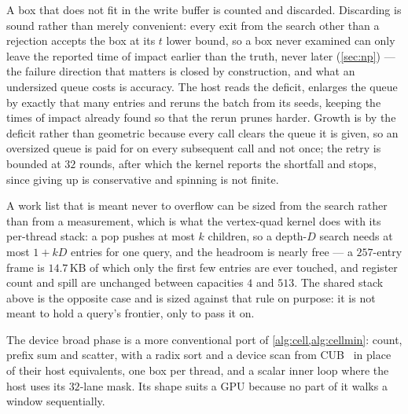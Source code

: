 A box that does not fit in the write buffer is counted and discarded. Discarding
is sound rather than merely convenient: every exit from the search other than a
rejection accepts the box at its $t$ lower bound, so a box never examined can
only leave the reported time of impact earlier than the truth, never later
(\cref{sec:np}) --- the failure direction that matters is closed by
construction, and what an undersized queue costs is accuracy. The host reads the
deficit, enlarges the queue by exactly that many entries and reruns the batch
from its seeds, keeping the times of impact already found so that the rerun
prunes harder. Growth is by the deficit rather than geometric because every call
clears the queue it is given, so an oversized queue is paid for on every
subsequent call and not once; the retry is bounded at $32$ rounds, after which
the kernel reports the shortfall and stops, since giving up is conservative and
spinning is not finite.

A work list that is meant never to overflow can be sized from the search rather
than from a measurement, which is what the vertex-quad kernel does with its
per-thread stack: a pop pushes at most $k$ children, so a depth-$D$ search needs
at most $1+kD$ entries for one query, and the headroom is nearly free --- a
$257$-entry frame is $14.7\,\mathrm{KB}$ of which only the first few entries are
ever touched, and register count and spill are unchanged between capacities $4$
and $513$. The shared stack above is the opposite case and is sized against that
rule on purpose: it is not meant to hold a query's frontier, only to pass it on.

The device broad phase is a more conventional port of \cref{alg:cell,alg:cellmin}:
count, prefix sum and scatter, with a radix sort and a device scan from
CUB~\citep{cub} in place of their host equivalents, one box per thread, and a
scalar inner loop where the host uses its $32$-lane mask. Its shape suits a GPU
because no part of it walks a window sequentially.

